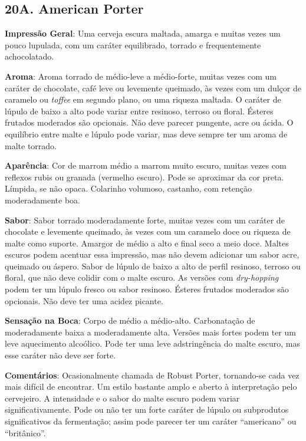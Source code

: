 \subsection*{20A. American Porter}
\textbf{Impressão Geral}: Uma cerveja escura maltada, amarga e muitas vezes um pouco lupulada, com um caráter equilibrado, torrado e frequentemente achocolatado.

\textbf{Aroma}: Aroma torrado de médio-leve a médio-forte, muitas vezes com um caráter de chocolate, café leve ou levemente queimado, às vezes com um dulçor de caramelo ou \textit{toffee} em segundo plano, ou uma riqueza maltada. O caráter de lúpulo de baixo a alto pode variar entre resinoso, terroso ou floral. Ésteres frutados moderados são opcionais. Não deve parecer pungente, acre ou ácida. O equilíbrio entre malte e lúpulo pode variar, mas deve sempre ter um aroma de malte torrado.

\textbf{Aparência}: Cor de marrom médio a marrom muito escuro, muitas vezes com reflexos rubis ou granada (vermelho escuro). Pode se aproximar da cor preta. Límpida, se não opaca. Colarinho volumoso, castanho, com retenção moderadamente boa.

\textbf{Sabor}: Sabor torrado moderadamente forte, muitas vezes com um caráter de chocolate e levemente queimado, às vezes com um caramelo doce ou riqueza de malte como suporte. Amargor de médio a alto e final seco a meio doce. Maltes escuros podem acentuar essa impressão, mas não devem adicionar um sabor acre, queimado ou áspero. Sabor de lúpulo de baixo a alto de perfil resinoso, terroso ou floral, que não deve colidir com o malte escuro. As versões com \textit{dry-hopping} podem ter um lúpulo fresco ou sabor resinoso. Ésteres frutados moderados são opcionais. Não deve ter uma acidez picante.

\textbf{Sensação na Boca}: Corpo de médio a médio-alto. Carbonatação de moderadamente baixa a moderadamente alta. Versões mais fortes podem ter um leve aquecimento alcoólico. Pode ter uma leve adstringência do malte escuro, mas esse caráter não deve ser forte.

\textbf{Comentários}: Ocasionalmente chamada de Robust Porter, tornando-se cada vez mais difícil de encontrar. Um estilo bastante amplo e aberto à interpretação pelo cervejeiro. A intensidade e o sabor do malte escuro podem variar significativamente. Pode ou não ter um forte caráter de lúpulo ou subprodutos significativos da fermentação; assim pode parecer ter um caráter “americano” ou “britânico”.

